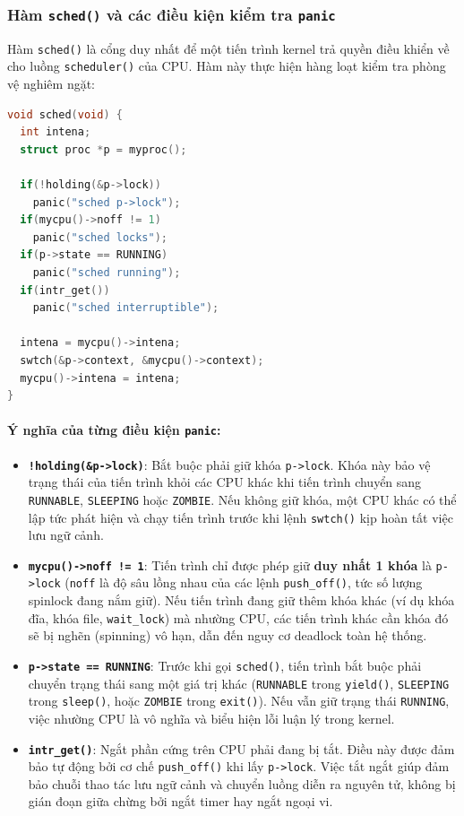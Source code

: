 \subsubsection{Hàm \texttt{sched()} và các điều kiện kiểm tra \texttt{panic}}
Hàm \texttt{sched()} là cổng duy nhất để một tiến trình kernel trả quyền điều khiển về cho luồng \texttt{scheduler()} của CPU. Hàm này thực hiện hàng loạt kiểm tra phòng vệ nghiêm ngặt:
\begin{lstlisting}[language=C]
void sched(void) {
  int intena;
  struct proc *p = myproc();

  if(!holding(&p->lock))
    panic("sched p->lock");
  if(mycpu()->noff != 1)
    panic("sched locks");
  if(p->state == RUNNING)
    panic("sched running");
  if(intr_get())
    panic("sched interruptible");

  intena = mycpu()->intena;
  swtch(&p->context, &mycpu()->context);
  mycpu()->intena = intena;
}
\end{lstlisting}

\paragraph{Ý nghĩa của từng điều kiện \texttt{panic}:}
\begin{itemize}
    \item \textbf{\texttt{!holding(\&p->lock)}}: Bắt buộc phải giữ khóa \texttt{p->lock}. Khóa này bảo vệ trạng thái của tiến trình khỏi các CPU khác khi tiến trình chuyển sang \texttt{RUNNABLE}, \texttt{SLEEPING} hoặc \texttt{ZOMBIE}. Nếu không giữ khóa, một CPU khác có thể lập tức phát hiện và chạy tiến trình trước khi lệnh \texttt{swtch()} kịp hoàn tất việc lưu ngữ cảnh.
    \item \textbf{\texttt{mycpu()->noff != 1}}: Tiến trình chỉ được phép giữ \textbf{duy nhất 1 khóa} là \texttt{p->lock} (\texttt{noff} là độ sâu lồng nhau của các lệnh \texttt{push\_off()}, tức số lượng spinlock đang nắm giữ). Nếu tiến trình đang giữ thêm khóa khác (ví dụ khóa đĩa, khóa file, \texttt{wait\_lock}) mà nhường CPU, các tiến trình khác cần khóa đó sẽ bị nghẽn (spinning) vô hạn, dẫn đến nguy cơ deadlock toàn hệ thống.
    \item \textbf{\texttt{p->state == RUNNING}}: Trước khi gọi \texttt{sched()}, tiến trình bắt buộc phải chuyển trạng thái sang một giá trị khác (\texttt{RUNNABLE} trong \texttt{yield()}, \texttt{SLEEPING} trong \texttt{sleep()}, hoặc \texttt{ZOMBIE} trong \texttt{exit()}). Nếu vẫn giữ trạng thái \texttt{RUNNING}, việc nhường CPU là vô nghĩa và biểu hiện lỗi luận lý trong kernel.
    \item \textbf{\texttt{intr\_get()}}: Ngắt phần cứng trên CPU phải đang bị tắt. Điều này được đảm bảo tự động bởi cơ chế \texttt{push\_off()} khi lấy \texttt{p->lock}. Việc tắt ngắt giúp đảm bảo chuỗi thao tác lưu ngữ cảnh và chuyển luồng diễn ra nguyên tử, không bị gián đoạn giữa chừng bởi ngắt timer hay ngắt ngoại vi.
\end{itemize}

